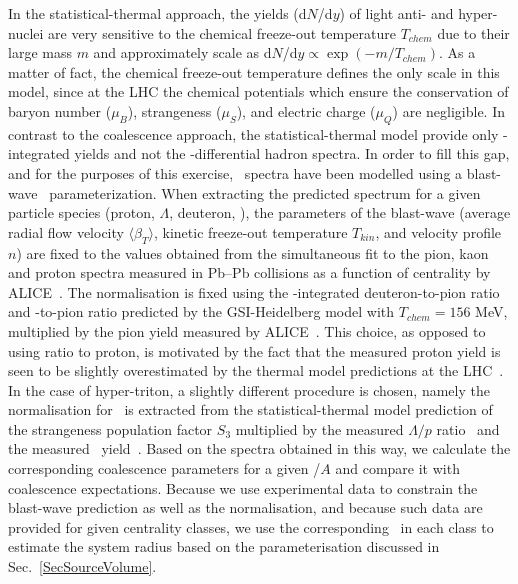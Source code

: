 \documentclass[a4paper,11pt]{scrartcl}
\begin{document}
In the statistical-thermal approach, the yields (d$N$/d$y$) of light anti- and hyper-nuclei are very sensitive to the chemical freeze-out temperature $T_{chem}$ due to their large mass $m$ and approximately scale as d$N$/d$y \propto \exp(-m/T_{chem})$. As a matter of fact, the chemical freeze-out temperature defines the only scale in this model, since at the LHC the chemical potentials which ensure the conservation of baryon number ($\mu_{B}$), strangeness ($\mu_{S}$), and electric charge ($\mu_{Q}$) are negligible.
In contrast to the coalescence approach, the statistical-thermal model \cite{Petran:2013dva,Wheaton:2004qb,Andronic:2005yp} provide only \pt-integrated yields and not the \pt-differential hadron spectra. 
In order to fill this gap, and for the purposes of this exercise, \pt~spectra have been modelled using a blast-wave~\cite{Schnedermann:1993ws} parameterization. When extracting the predicted spectrum for a given particle species (proton, $\Lambda$, deuteron, \hethree), the parameters of the blast-wave (average radial flow velocity $\langle\beta_{T}\rangle$, kinetic freeze-out temperature $T_{kin}$, and velocity profile $n$) are fixed to the values obtained from the simultaneous fit to the pion, kaon and proton spectra measured in Pb--Pb collisions as a function of centrality by ALICE~\cite{Abelev:2013vea}. 
The normalisation is fixed using the \pt-integrated deuteron-to-pion ratio and \hethree-to-pion ratio predicted by the GSI-Heidelberg model with $T_{chem} = 156$ MeV, multiplied by the pion yield measured by ALICE~\cite{Abelev:2013vea}. 
This choice, as opposed to using ratio to proton, is motivated by the fact that the measured proton yield is seen to be slightly overestimated by the thermal model predictions at the LHC~\cite{Abelev:2012wca}.
In the case of hyper-triton, a slightly different procedure is chosen, namely the normalisation for \hthreelambda~is extracted from the statistical-thermal model prediction of the strangeness population factor $S_{3}$ multiplied by the measured $\Lambda/p$ ratio~\cite{Abelev:2013vea,Abelev:2013xaa} and the measured \hethree~yield~\cite{ALICE:deuteronppPbPb2015}. Based on the spectra obtained in this way, we calculate the corresponding coalescence parameters for a given \pt/$A$ and compare it with coalescence expectations. Because we use experimental data to constrain the blast-wave prediction as well as the normalisation, and because such data are provided for given centrality classes, we use the corresponding \avdNdeta~in each class to estimate the system radius based on the parameterisation discussed in Sec.~\ref{SecSourceVolume}. 
\end{document}
